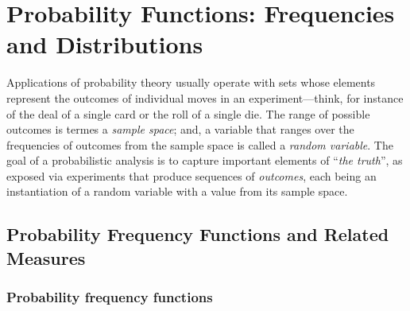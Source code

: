 \section{Probability Functions: Frequencies and Distributions}
\label{sec:prob-distributions}

 

Applications of probability theory usually operate with sets whose
elements represent the outcomes of individual moves in an
experiment---think, for instance of the deal of a single card or the
roll of a single die.  The range of possible outcomes is termes a {\it
  sample space}; and, a variable that ranges over the frequencies of
outcomes from the sample space is called a {\it random variable}.  The
goal of a probabilistic analysis is to capture important elements of
``{\em the truth}'', as exposed via experiments that produce sequences
of {\em outcomes}, each being an instantiation of a random variable
with a value from its sample space.


\subsection{Probability Frequency Functions and Related Measures}
\label{sec:prob-freq-fns+measures}

\subsubsection{Probability frequency functions}
\label{sec:prob-freq-fns}

